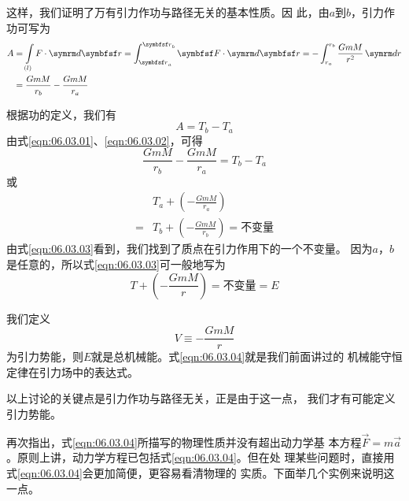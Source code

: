 这样，我们证明了万有引力作功与路径无关的基本性质。因
此，由$ a $到$ b $，引力作功可写为
\begin{equation}\label{eqn:06.03.01}
  \begin{aligned}
    A & = \int \limits _{(l)} F \cdot \dif \vec{r} = \int _ { \vec{r}_a } ^ { \vec{r}_b } \vec{F} \cdot \dif \vec{r} = - \int _ { r _ a } ^ { r _ b } \frac { G m M } { r ^ { 2 } } \dif r \\
      & = \frac { G m M } { r _ { b } } - \frac { G m M } { r _ { a } }
  \end{aligned}
\end{equation}

\clearpage
根据功的定义，我们有
\begin{equation}\label{eqn:06.03.02}
  A = T _ { b } - T _ { a }
\end{equation}
由式\eqref{eqn:06.03.01}、\eqref{eqn:06.03.02}，可得
\begin{equation*}
  \frac { G m M } { r _ { b } } - \frac { G m M } { r _ { a } } = T _ { b } - T _ { a }
\end{equation*}
或\vspace{-1.56em}
\begin{equation}\label{eqn:06.03.03}
  \begin{aligned}
      & T _ { a } + \left( - \frac { G m M } { r _ { a } } \right)                 \\
    = & T _ { b } + \left( - \frac { G m M } { r _ { b } } \right) = \text{不变量}
  \end{aligned}
\end{equation}
由式\eqref{eqn:06.03.03}看到，我们找到了质点在引力作用下的一个不变量。
因为$ a $，$ b $是任意的，所以式\eqref{eqn:06.03.03}可一般地写为
\begin{equation}\label{eqn:06.03.04}
  T + \left( - \frac { G m M } { r } \right) = \text{不变量} = E
\end{equation}

我们定义
\begin{equation}\label{eqn:06.03.05}
  V \equiv - \frac { G m M } { r }
\end{equation}
为引力势能，则$ E $就是总机械能。式\eqref{eqn:06.03.04}就是我们前面讲过的
机械能守恒定律在引力场中的表达式。

以上讨论的关键点是引力作功与路径无关，正是由于这一点，
我们才有可能定义引力势能。

再次指出，式\eqref{eqn:06.03.04}所描写的物理性质并没有超出动力学基
本方程$ \vec{F} = m \vec{a} $。原则上讲，动力学方程已包括式\eqref{eqn:06.03.04}。但在处
理某些问题时，直接用式\eqref{eqn:06.03.04}会更加简便，更容易看清物理的
实质。下面举几个实例来说明这一点。

